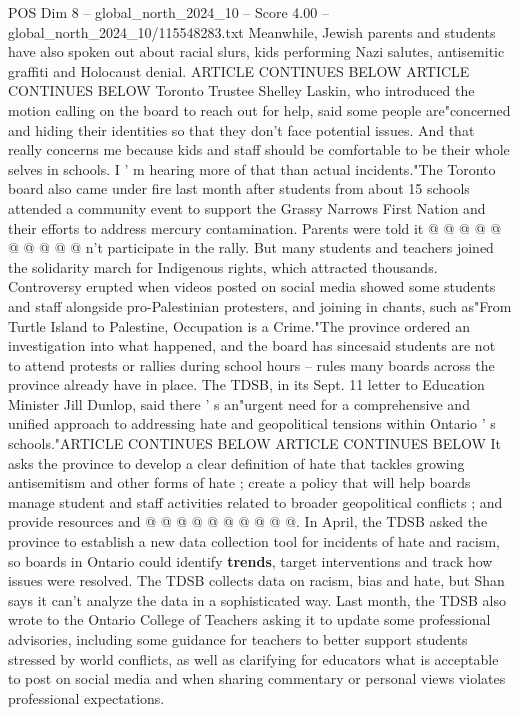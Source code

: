 \begin{textsample}{POS Dim 8 – global\_north\_2024\_10 – Score 4.00 – global\_north\_2024\_10/115548283.txt}
Meanwhile, Jewish parents and students have also spoken out about racial slurs, kids performing Nazi salutes, antisemitic graffiti and Holocaust denial.
ARTICLE CONTINUES BELOW ARTICLE CONTINUES BELOW Toronto Trustee Shelley Laskin, who introduced the motion calling on the board to reach out for help, said some people are"concerned and hiding their identities so that they don't face potential issues.
And that really concerns me because kids and staff should be comfortable to be their whole selves in schools.
I ' m hearing more of that than actual incidents."The Toronto board also came under fire last month after students from about 15 schools attended a community event to support the Grassy Narrows First Nation and their efforts to address mercury contamination.
Parents were told it @ @ @ @ @ @ @ @ @ @ n't participate in the rally.
But many students and teachers joined the solidarity march for Indigenous rights, which attracted thousands.
Controversy erupted when videos posted on social media showed some students and staff alongside pro-Palestinian protesters, and joining in chants, such as"From Turtle Island to Palestine, Occupation is a Crime."The province ordered an investigation into what happened, and the board has sincesaid students are not to attend protests or rallies during school hours -- rules many boards across the province already have in place.
The TDSB, in its Sept. 11 letter to Education Minister Jill Dunlop, said there ' s an"urgent need for a comprehensive and unified approach to addressing hate and geopolitical tensions within Ontario ' s schools."ARTICLE CONTINUES BELOW ARTICLE CONTINUES BELOW It asks the province to develop a clear definition of hate that tackles growing antisemitism and other forms of hate ; create a policy that will help boards manage student and staff activities related to broader geopolitical conflicts ; and provide resources and @ @ @ @ @ @ @ @ @ @.
In April, the TDSB asked the province to establish a new data collection tool for incidents of hate and racism, so boards in Ontario could identify \textbf{trends}, target interventions and track how issues were resolved.
The TDSB collects data on racism, bias and hate, but Shan says it can't analyze the data in a sophisticated way.
Last month, the TDSB also wrote to the Ontario College of Teachers asking it to update some professional advisories, including some guidance for teachers to better support students stressed by world conflicts, as well as clarifying for educators what is acceptable to post on social media and when sharing commentary or personal views violates professional expectations.

\end{textsample}
